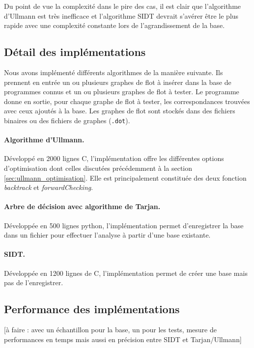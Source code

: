 Du point de vue la complexité dans le pire des cas, il est clair que l'algorithme d'Ullmann est très inefficace et l'algorithme SIDT devrait s'avérer être le plus rapide avec une complexité constante lors de l'agrandissement de la base.

\subsection{Détail des implémentations}
Nous avons implémenté différents algorithmes de la manière suivante. Ils prennent en entrée un ou plusieurs graphes de flot à insérer dans la base de programmes connus et un ou plusieurs graphes de flot à tester.
Le programme donne en sortie, pour chaque graphe de flot à tester, les correspondances trouvées avec ceux ajoutés à la base.
Les graphes de flot sont stockés dans des fichiers binaires ou des fichiers de graphes (\texttt{.dot}).

\paragraph{Algorithme d'Ullmann.}
Développé en 2000 lignes C, l'implémentation offre les différentes options d'optimisation dont celles discutées précédemment à la section \ref{sec:ullmann_optimisation}.
Elle est principalement constituée des deux fonction \emph{backtrack} et \emph{forwardChecking}.

\paragraph{Arbre de décision avec algorithme de Tarjan.}
Développée en 500 lignes python, l'implémentation permet d'enregistrer la base dans un fichier pour effectuer l'analyse à partir d'une base existante.

\paragraph{SIDT.}
Développée en 1200 lignes de C, l’implémentation permet de créer une base mais pas de l'enregistrer.

\subsection{Performance des implémentations}
[à faire : avec un échantillon pour la base, un pour les tests, mesure de performances en temps mais aussi en précision entre SIDT et Tarjan/Ullmann]
